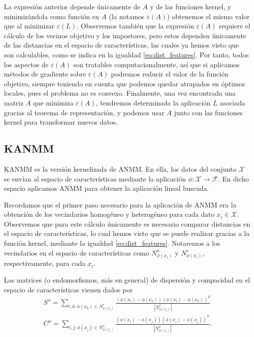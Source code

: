 \documentclass{book}
\begin{document}
La expresión anterior depende únicamente de $A$ y de las funciones kernel, y minimizándola como función en $A$ (la notamos $\varepsilon(A)$) obtenemos el mismo valor que al minimizar $\varepsilon(L)$. Observemos también que la expresión $\varepsilon(A)$ requiere el cálculo de los vecinos objetivo y los impostores, pero estos dependen únicamente de las distancias en el espacio de características, las cuales ya hemos visto que son calculables, como se indica en la igualdad \ref{eq:dist_features}. Por tanto, todos los aspectos de $\varepsilon(A)$ son tratables computacionalmente, así que si aplicamos métodos de gradiente sobre $\varepsilon(A)$ podremos reducir el valor de la función objetivo, siempre teniendo en cuenta que podemos quedar atrapados en óptimos locales, pues el problema no es convexo. Finalmente, una vez encontrada una matriz $A$ que minimiza $\varepsilon(A)$, tendremos determinada la aplicación $L$ asociada gracias al teorema de representación, y podemos usar $A$ junto con las funciones kernel para transformar nuevos datos. 

\subsection{KANMM}

KANMM \cite{anmm} es la versión kernelizada de ANMM. En ella, los datos del conjunto $\mathcal{X}$ se envían al espacio de características mediante la aplicación $\phi\colon \mathcal{X} \to \mathcal{F}$. En dicho espacio aplicamos ANMM para obtener la aplicación lineal buscada.

Recordamos que el primer paso necesario para la aplicación de ANMM era la obtención de los vecindarios homogéneo y heterogéneo para cada dato $x_i \in \mathcal{X}$. Observemos que para este cálculo únicamente es necesario comparar distancias en el espacio de características, lo cual hemos visto que se puede realizar gracias a la función kernel, mediante la igualdad \ref{eq:dist_features}. Notaremos a los vecindarios en el espacio de características como $N_{\phi(x_i)}^o$ y $N_{\phi(x_i)}^e$, respectivamente, para cada $x_i$.

Las matrices (o endomorfismos, más en general) de dispersión y compacidad en el espacio de características vienen dados por
\begin{align*}
	S^{\phi} = \sum\limits_{i,k \colon \phi(x_k) \in N_{\phi(x_i)}^e} \frac{(\phi(x_i)-\phi(x_k))(\phi(x_i)-\phi(x_k))^T}{|N_{\phi(x_i)}^e|} \\
	C^{\phi} = \sum\limits_{i,j \colon \phi(x_j) \in N_{\phi(x_i)}^o} \frac{(\phi(x_i)-\phi(x_j))(\phi(x_i)-\phi(x_j))^T}{|N_{\phi(x_i)}^o|}.
\end{align*}
\end{document}
